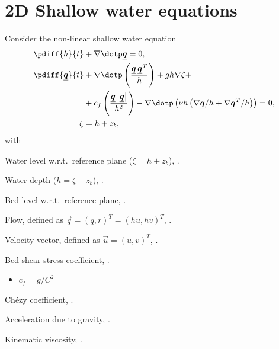 \chapter{2D Shallow water equations}\label{sec:2d_swe}
Consider the non-linear shallow water equation
\begin{subequations}
    \begin{align}
    \pdiff{h}{t} & + \nabla \dotp \vec{q}  = 0,
    \\
    \pdiff{\vec{q}}{t} & + \nabla \dotp \left( \frac{\vec{q}\,\vec{q}^T}{h} \right) + gh \nabla \zeta +
    \nonumber \\
    & + c_f \left( \frac{\vec{q}\abs{\vec{q}}}{h^2} \right)
    - \nabla \dotp \left( \nu h \left(  \nabla \vec{q}/h + \nabla \vec{q}^T/h \right) \right) = 0,
    \\
    \zeta & = h + z_b,
\end{align}
\end{subequations}
with
\begin{symbollist}
    \item[$\zeta$] Water level  w.r.t.\ reference plane ($\zeta = h + z_b$), \bunit{\metre}.
    \item[$h$] Water depth ($h = \zeta - z_b$), \bunit{\metre}.
    \item[$z_b$] Bed level  w.r.t.\ reference plane, \bunit{\metre}.
    \item[$\vec{q}$] Flow, defined as $\vec{q} = (q, r)^T = (hu, hv)^T$, \bunit{\square\metre\per\second}.
    \item[$\vec{u}$] Velocity vector, defined as $\vec{u} = (u, v)^T$, \bunit{\metre\per\second}.
    \item[$c_f$] Bed shear stress coefficient, \bunit{-}.
    \begin{itemize}
        \item[Ch\'ezy:] $c_f = g/C^2$
    \end{itemize}
    \item[$C$] Ch\'ezy coefficient, .

    \item[$g$] Acceleration due to gravity, \bunit{\metre\per\square\second}.
    \item[$\nu$] Kinematic viscosity, \bunit{\square\metre\per\second}.
\end{symbollist}
